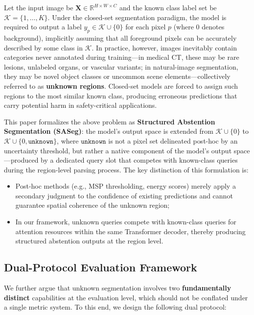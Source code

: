 \documentclass[3p,twocolumn,authoryear]{elsarticle}
\newcommand{\R}{\mathbb{R}}                              %
\newcommand{\cK}{\mathcal{K}}                             %
\begin{document}
Let the input image be $\mathbf{X} \in \R^{H \times W \times C}$ and the known class
label set be $\cK = \{1, \ldots, K\}$.
Under the closed-set segmentation paradigm, the model is required to output a label
$y_p \in \cK \cup \{0\}$ for each pixel $p$ (where $0$ denotes background), implicitly
assuming that all foreground pixels can be accurately described by some class in $\cK$.
In practice, however, images inevitably contain categories never annotated during
training---in medical CT, these may be rare lesions, unlabeled organs, or vascular
variants; in natural-image segmentation, they may be novel object classes or uncommon
scene elements---collectively referred to as \textbf{unknown regions}.
Closed-set models are forced to assign such regions to the most similar known class,
producing erroneous predictions that carry potential harm in safety-critical applications.

This paper formalizes the above problem as \textbf{Structured Abstention Segmentation (SASeg)}:
the model's output space is extended from $\cK \cup \{0\}$ to
$\cK \cup \{0, \texttt{unknown}\}$,
where $\texttt{unknown}$ is not a pixel set delineated post-hoc by an uncertainty
threshold, but rather a native component of the model's output space---produced by
a dedicated query slot that competes with known-class queries during the region-level
parsing process.
The key distinction of this formulation is:
\begin{itemize}[nosep]
  \item Post-hoc methods (e.g., MSP thresholding, energy scores) merely apply a
        secondary judgment to the confidence of existing predictions and cannot guarantee
        spatial coherence of the unknown region;
  \item In our framework, unknown queries compete with known-class queries for attention
        resources within the same Transformer decoder, thereby producing structured
        abstention outputs at the region level.
\end{itemize}

\subsection{Dual-Protocol Evaluation Framework}\label{sec:problem:protocol}

We further argue that unknown segmentation involves two \textbf{fundamentally distinct}
capabilities at the evaluation level, which should not be conflated under a single
metric system. To this end, we design the following dual protocol:
\end{document}
